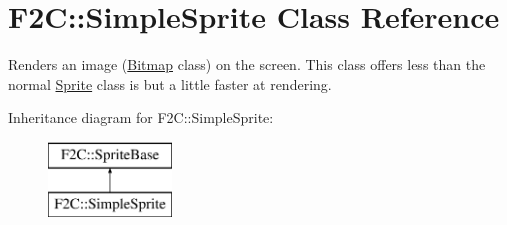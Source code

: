 \hypertarget{class_f2_c_1_1_simple_sprite}{
\section{F2C::SimpleSprite Class Reference}
\label{class_f2_c_1_1_simple_sprite}
}


Renders an image (\hyperlink{class_f2_c_1_1_bitmap}{Bitmap} class) on the screen. This class offers less than the normal \hyperlink{class_f2_c_1_1_sprite}{Sprite} class is but a little faster at rendering.  


Inheritance diagram for F2C::SimpleSprite:\begin{figure}[H]
\begin{center}
\leavevmode
\includegraphics[height=2.000000cm]{class_f2_c_1_1_simple_sprite}
\end{center}
\end{figure}
